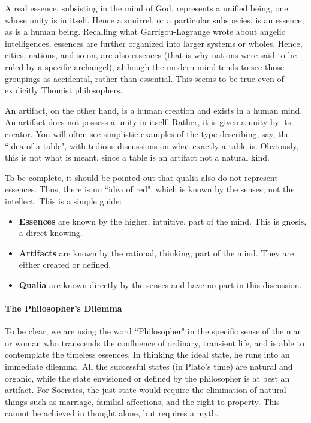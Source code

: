 A real essence, subsisting in the mind of God, represents a unified being, one whose unity is in itself. Hence a squirrel, or a particular subspecies, is an essence, as is a human being. Recalling what Garrigou-Lagrange wrote about angelic intelligences, essences are further organized into larger systems or wholes. Hence, cities, nations, and so on, are also essences (that is why nations were said to be ruled by a specific archangel), although the modern mind tends to see those groupings as accidental, rather than essential. This seems to be true even of explicitly Thomist philosophers.

An artifact, on the other hand, is a human creation and exists in a human mind. An artifact does not possess a unity-in-itself. Rather, it is given a unity by its creator. You will often see simplistic examples of the type describing, say, the ``idea of a table", with tedious discussions on what exactly a table is. Obviously, this is not what is meant, since a table is an artifact not a natural kind.

To be complete, it should be pointed out that qualia also do not represent essences. Thus, there is no ``idea of red", which is known by the senses, not the intellect. This is a simple guide:

\begin{itemize}
\item \textbf{Essences} are known by the higher, intuitive, part of the mind. This is gnosis, a direct knowing. 
\item \textbf{Artifacts} are known by the rational, thinking, part of the mind. They are either created or defined. 
\item \textbf{Qualia} are known directly by the senses and have no part in this discussion. 
\end{itemize}
\paragraph{The Philosopher's Dilemma}
To be clear, we are using the word ``Philosopher" in the specific sense of the man or woman who transcends the confluence of ordinary, transient life, and is able to contemplate the timeless essences. In thinking the ideal state, he runs into an immediate dilemma. All the successful states (in Plato's time) are natural and organic, while the state envisioned or defined by the philosopher is at best an artifact. For Socrates, the just state would require the elimination of natural things such as marriage, familial affections, and the right to property. This cannot be achieved in thought alone, but requires a myth.

